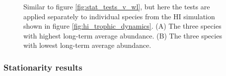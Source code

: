 
\begin{figure}[hp]
	\centering
     \caption{Similar to figure \ref{fig:stat_tests_v_wl}, but here the tests are applied separately to individual species from the HI simulation shown in figure \ref{fig:hi_trophic_dynamics}. (A) The three species with highest long-term average abundance. (B) The three species with lowest long-term average abundance.} 
     \label{fig:sp_stat_tests_v_wl}   
\end{figure}

\newpage
\subsubsection{Stationarity results}
\label{sec:ensemble}


